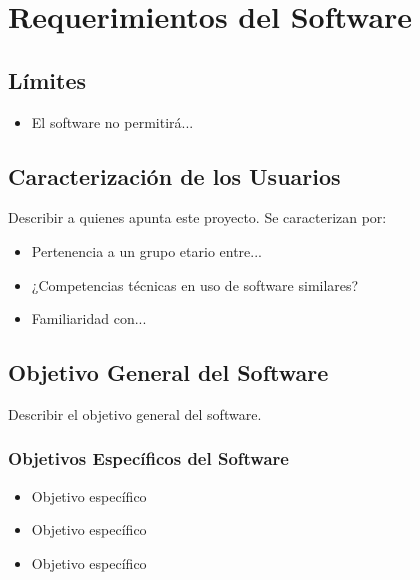 \chapter{Requerimientos del Software}

\section{Límites}

\begin{itemize}
	\item El software no permitirá...
\end{itemize}

\section{Caracterización de los Usuarios}
Describir a quienes apunta este proyecto. Se caracterizan por:

\begin{itemize}
	\item Pertenencia a un grupo etario entre...
	\item ¿Competencias técnicas en uso de software similares?
	\item Familiaridad con...
\end{itemize}

\section{Objetivo General del Software}
Describir el objetivo general del software.

\subsection{Objetivos Específicos del Software}
\begin{itemize}
	\item Objetivo específico
	\item Objetivo específico
	\item Objetivo específico
\end{itemize}

